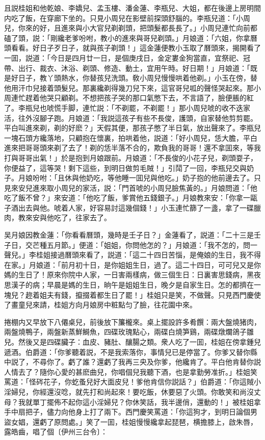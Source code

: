 且説桂姐和他乾娘、李嬌兒、孟玉樓、潘金蓮、李瓶兒、大姐，都在後邊上房明間内吃了飯，在穿廊下坐的。只見小周兒在影壁前探頭舒腦的。李瓶兒道：「小周兒，你來的好，且進來與小大官兒剃剃頭，把頭髮都長長了。」小周兒連忙向前都磕了頭，説：「剛纔老爹吩咐，教小的進來與哥兒剃頭。」月娘道：「六姐，你拿曆頭看看。好日子歹日子，就與孩子剃頭！」這金蓮便教小玉取了曆頭來，揭開看了一囬，説道：「今日是四月廿一日，是個庚戌日，金定婁金狗當直，宜祭祀、冠帶、出行、裁衣、沐浴、剃頭、修造、動土，宜用午時。好日期！」月娘道：「既是好日子，教丫頭熱水，你替孩兒洗頭。敎小周兒慢慢哄着他剃。」小玉在傍，替他用汗巾兒接着頭髮兒。那裏纔剃得幾刀兒下來，這官哥兒呱的聲怪哭起來。那小周連忙趕着他哭只顧剃。不想把孩子哭的那口氣憋下去，不言語了，臉便脹的紅了。李瓶兒也唬慌手脚，連忙説：「不剃罷，不剃罷！」那小周兒唬的收不迭家活，往外沒腳子跑。月娘道：「我説這孩子有些不長俊，護頭，自家替他剪剪罷。平白叫進來剃，剃的好麽？」天假其便，那孩子憋了半日氣，放出聲來了。李瓶兒一塊石頭方纔落地，只顧抱在懷裏，拍哄着他，説道：「好小周兒，恁大膽，平白進來把哥哥頭來剃了去了！剃的恁半落不合的，欺負我的哥哥！還不拿囬來，等我打與哥哥出氣！」於是抱到月娘跟前。月娘道：「不長俊的小花子兒，剃頭耍子，你便益了，這等哭！剩下這些，到明日做剪毛賊！」引鬦了一回，李瓶兒交與奶子。月娘吩咐：「且休與他奶吃，等他睡一囬兒與他吃。」奶子抱的他前邊去了。只見來安兒進來取小周兒的家活，説：「門首唬的小周兒臉焦黃的。」月娘問道：「他吃了飯不曾？」來安道：「他吃了飯，爹賞他五錢銀子。」月娘教來安：「你拿一甌子酒出去與他。唬着人家，好容易討這幾個錢！」小玉連忙篩了一盞，拿了一碟臘肉，教來安與他吃了，往家去了。

吴月娘因教金蓮：「你看看曆頭，幾時是壬子日？」金蓮看了，説道：「二十三是壬子日，交芒種五月節。」便道：「姐姐，你問他怎的？」月娘道：「我不怎的，問一聲兒。」李桂姐接過曆頭來看了，説道：「這二十四日苦惱，是俺娘的生日，我不得在家。」月娘道：「前月初十日，是你姐姐生日，過了。這二十四日，可可兒又是你媽的生日了！原來你院中人家，一日害兩樣病，做三個生日：日裏害思錢病，黑夜思漢子的病；早晨是媽的生日，晌午是姐姐生日，晚夕是自家生日。怎的都擠在一塊兒？趂着姐夫有錢，攛掇着都生日了罷！」桂姐只是笑，不做聲。只見西門慶使了畫童兒來請，桂姐方向月娘房中粧點匀了臉，往花園中來。

捲棚内又早放下八僊桌兒，前後放下簾櫳來。桌上擺設許多肴饌：兩大盤燒猪肉，兩盤燒鴨子，兩盤新蒸鮮鰣魚，四碟玫瑰點心，兩碟白燒笋鷄，兩碟燉爛鴿子雛兒。然後又是四碟臟子：血皮、豬肚、釀腸之類。衆人吃了一囬，桂姐在傍拿鍾兒遞酒。伯爵道：「你爹聽着説，不是我索落你，事情兒已是停當了。你爹又替你縣中説了，不尋你了。虧了誰？還虧了我再三央及你爹，他纔肯了。平白他肯替你説人情去了？隨你心愛的甚麽曲兒，你唱個兒我聽下酒，也是拿勤勞准折。」桂姐笑罵道：「怪硶花子，你虼蚤兒好大面皮兒！爹他肯信你説話？」伯爵道：「你這賊小淫婦兒，你經還沒唸，就先打和尚起來！要吃飯，休要惡了火頭。你敢笑和尚沒丈母？我就單丁擺佈不起你這小淫婦兒？你休笑話，我半邊俏，還動的！」被桂姐拿手中扇把子，儘力向他身上打了兩下。西門慶笑罵道：「你這狗才，到明日論個男盜女娼，還虧了原問處。」笑了一囬，桂姐慢慢纔拿起琵琶，横擔膝上，啟朱唇，露皓齒，唱了個〔伊州三台令〕：

